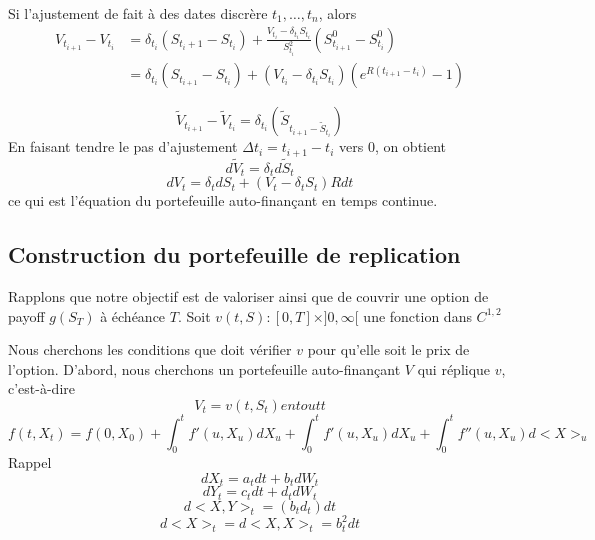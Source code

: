 \documentclass{article}
\theoremstyle{plain}
\theoremstyle{definition}
\begin{document}
Si l'ajustement de fait \`a des dates discr\`ere $t_1,\ldots,t_n$,  alors
\begin{equation}
\begin{split}
V_{t_{i+1}}-V_{t_i}&=\delta_{t_i}(S_{t_i+1}-S_{t_i})+\frac{V_{t_i}-\delta_{t_i}S_{t_i}}{S^2_{t_i}}(S^0_{t_{i+1}}-S^0_{t_{i}})\\
&=\delta_{t_i}(S_{t_{i+1}}-S_{t_i})+(V_{t_i}-\delta_{t_i}S_{t_i})(e^{R(t_{i+1}-t_i)}-1)
\end{split}
\end{equation}

\begin{equation}
\tilde{V}_{t_{i+1}}-\tilde{V}_{t_i}=\delta_{t_i}(\tilde{S}_{t_{i+1}-\tilde{S}_{t_i}})
\end{equation}
En faisant tendre le pas d'ajustement $\Delta t_i=t_{i+1}-t_i$ vers $0$, on obtient
\begin{equation}
d\tilde{V}_t=\delta_td\tilde{S}_t
\end{equation}
\begin{equation}
dV_t=\delta_tdS_t+(V_t-\delta_t S_t)Rdt
\end{equation}
ce qui est l'\'equation du portefeuille auto-finan\c{c}ant en temps continue. 

\subsection{Construction du portefeuille de replication}

Rapplons que notre objectif est de valoriser ainsi que de couvrir une option de payoff $g(S_T)$ \`a \'ech\'eance $T$.
Soit $v(t,S):[0,T]\times]0,\infty[ $ une fonction dans $C^{1,2}$ 
 
Nous cherchons les conditions que doit v\'erifier $v$ pour qu'elle soit le prix de l'option.
D'abord, nous cherchons un portefeuille auto-finan\c{c}ant $V$ qui r\'eplique $v$, c'est-\`a-dire
\begin{equation}
V_t=v(t,S_t)  en tout t
\end{equation}
\begin{equation}
f(t,X_t)=f(0,X_0)+\int_0^tf'(u,X_u)dX_u+\int_0^t f'(u,X_u)dX_u+\int_0^tf''(u,X_u)d<X>_u
\end{equation}
Rappel
\begin{equation}
dX_t=a_tdt+b_tdW_t
\end{equation}
\begin{equation}
dY_t=c_tdt+d_tdW_t
\end{equation}
\begin{equation}
d<X,Y>_t=(b_td_t)dt
\end{equation}
\begin{equation}
d<X>_t=d<X,X>_t=b_t^2dt
\end{equation}
\end{document}
